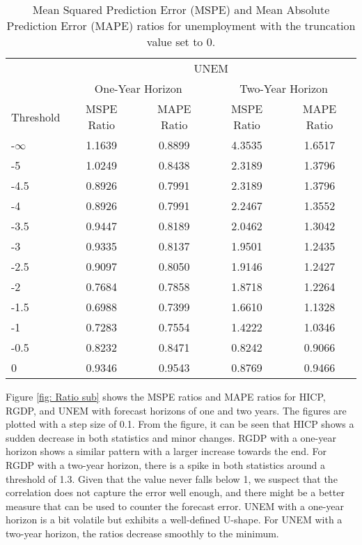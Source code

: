 \documentclass[11pt]{article}
\begin{document}
	\begin{table}[!h] 
		\centering
		\caption{Mean Squared Prediction Error (MSPE) and Mean Absolute Prediction Error (MAPE) ratios for unemployment with the truncation value set to 0.}
		\label{tab: MSPE UNEM}
		\begin{tabular}{lcccc}
			\hline\hline
			& \multicolumn{4}{c}{UNEM}                                                \\
			\cmidrule(lr){2-5}
			& \multicolumn{2}{c}{One-Year Horizon} & \multicolumn{2}{c}{Two-Year Horizon} \\
			\cmidrule(lr){2-3} \cmidrule(lr){4-5}
			Threshold & MSPE Ratio &    MAPE Ratio    & MSPE Ratio &    MAPE Ratio    \\ 
			\hline
			-$\infty$ & 1.1639 & 0.8899 & 4.3535 & 1.6517\\ 
			-5 & 1.0249 & 0.8438 & 2.3189 & 1.3796\\ 
			-4.5 & 0.8926 & 0.7991 & 2.3189 & 1.3796\\ 
			-4 & 0.8926 & 0.7991 & 2.2467 & 1.3552\\ 
			-3.5 & 0.9447 & 0.8189 & 2.0462 & 1.3042\\ 
			-3 & 0.9335 & 0.8137 & 1.9501 & 1.2435\\ 
			-2.5 & 0.9097 & 0.8050 & 1.9146 & 1.2427\\ 
			-2 & 0.7684 & 0.7858 & 1.8718 & 1.2264\\ 
			-1.5 & 0.6988 & 0.7399 & 1.6610 & 1.1328\\ 
			-1 & 0.7283 & 0.7554 & 1.4222 & 1.0346\\ 
			-0.5 & 0.8232 & 0.8471 & 0.8242 & 0.9066\\ 
			0 & 0.9346 & 0.9543 & 0.8769 & 0.9466\\ \hline\hline
		\end{tabular}
	\end{table}
	
	
	Figure \ref{fig: Ratio sub} shows the MSPE ratios and MAPE ratios for HICP, RGDP, and UNEM with forecast horizons of one and two years. The figures are plotted with a step size of 0.1. From the figure, it can be seen that HICP shows a sudden decrease in both statistics and minor changes. RGDP with a one-year horizon shows a similar pattern with a larger increase towards the end. For RGDP with a two-year horizon, there is a spike in both statistics around a threshold of 1.3. Given that the value never falls below 1, we suspect that the correlation does not capture the error well enough, and there might be a better measure that can be used to counter the forecast error. UNEM with a one-year horizon is a bit volatile but exhibits a well-defined U-shape. For UNEM with a two-year horizon, the ratios decrease smoothly to the minimum.
	
\end{document}
